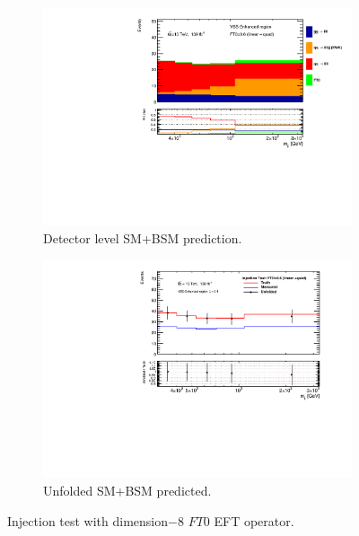 \begin{figure}[htb]
    \centering
    \begin{subfigure}{.49\textwidth}
        \centering
        \includegraphics[width=.9\linewidth]{figures/Analysis/Unfolding/injection_test_FT0_quad_mjj_detectorPred.pdf}
        \caption{ Detector level SM+BSM prediction. \label{fig:Dim8cont} }
    \end{subfigure}
    \begin{subfigure}{.49\textwidth}
        \centering
        \includegraphics[width=.9\linewidth]{figures/Analysis/Unfolding/injection_test_FT0_quad_mjj.pdf}
        \caption{Unfolded SM+BSM predicted. \label{fig:InjectTestResult}}
    \end{subfigure}
    \caption{ Injection test with  dimension$-8$ $FT0$ EFT operator. \label{fig:injection_test_FT0_quad}}
\end{figure}

